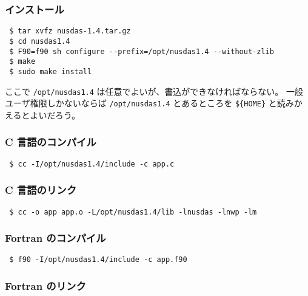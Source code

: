 \subsubsection*{インストール}

\begin{screen}
\begin{verbatim}
 $ tar xvfz nusdas-1.4.tar.gz
 $ cd nusdas1.4
 $ F90=f90 sh configure --prefix=/opt/nusdas1.4 --without-zlib
 $ make
 $ sudo make install
\end{verbatim}
\end{screen}

ここで \verb|/opt/nusdas1.4| は任意でよいが、書込ができなければならない。
一般ユーザ権限しかないならば \verb|/opt/nusdas1.4| とあるところを
\verb|${HOME}| と読みかえるとよいだろう。


\subsubsection*{C 言語のコンパイル}

\begin{screen}
\begin{verbatim}
 $ cc -I/opt/nusdas1.4/include -c app.c
\end{verbatim}
\end{screen}

\subsubsection*{C 言語のリンク}

\begin{screen}
\begin{verbatim}
 $ cc -o app app.o -L/opt/nusdas1.4/lib -lnusdas -lnwp -lm
\end{verbatim}
\end{screen}

\subsubsection*{Fortran のコンパイル}

\begin{screen}
\begin{verbatim}
 $ f90 -I/opt/nusdas1.4/include -c app.f90
\end{verbatim}
\end{screen}

\subsubsection*{Fortran のリンク}

